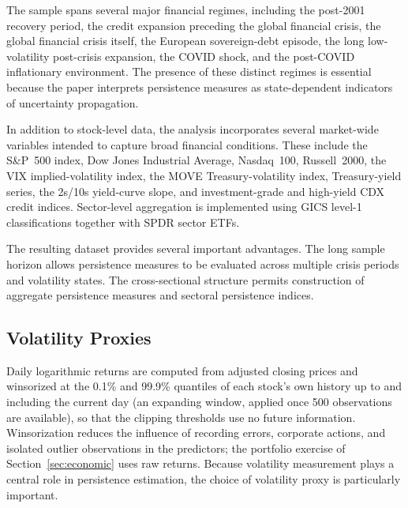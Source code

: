 \documentclass[jrfm,article,submit,moreauthors,pdftex]{Definitions/mdpi}
\begin{document}
The sample spans several major financial regimes, including the post-2001
recovery period, the credit expansion preceding the global financial
crisis, the global financial crisis itself, the European sovereign-debt
episode, the long low-volatility post-crisis expansion, the COVID shock,
and the post-COVID inflationary environment. The presence of these distinct
regimes is essential because the paper interprets persistence measures as
state-dependent indicators of uncertainty propagation.

In addition to stock-level data, the analysis incorporates several
market-wide variables intended to capture broad financial conditions. These
include the S\&P~500 index, Dow Jones Industrial Average, Nasdaq~100,
Russell~2000, the VIX implied-volatility index, the MOVE Treasury-volatility
index, Treasury-yield series, the 2s/10s yield-curve slope, and
investment-grade and high-yield CDX credit indices. Sector-level
aggregation is implemented using GICS level-1 classifications together
with SPDR sector ETFs.

The resulting dataset provides several important advantages. The long
sample horizon allows persistence measures to be evaluated across multiple
crisis periods and volatility states. The cross-sectional structure permits
construction of aggregate persistence measures and sectoral persistence
indices.

\subsection{Volatility Proxies}

Daily logarithmic returns are computed from adjusted closing prices and
winsorized at the 0.1\% and 99.9\% quantiles of each stock's own history
up to and including the current day (an expanding window, applied once 500
observations are available), so that the clipping thresholds use no future
information. Winsorization reduces the influence of recording errors,
corporate actions, and isolated outlier observations in the predictors; the
portfolio exercise of Section~\ref{sec:economic} uses raw returns. Because volatility measurement plays a
central role in persistence estimation, the choice of volatility proxy is
particularly important.
\end{document}
